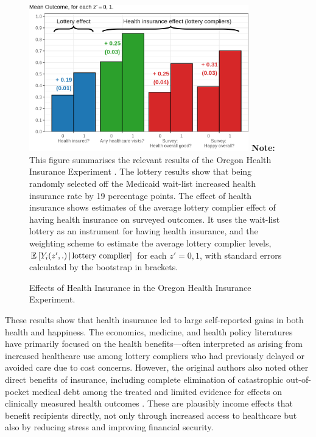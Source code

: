 \begin{figure}[!h]
    \caption{Effects of Health Insurance in the Oregon Health Insurance Experiment.}
    \centering
    \includegraphics[width=0.85\textwidth]{sections/figures/insurance-effects.png}
    \label{fig:healthinsurance-effects}
    \justify
    \footnotesize    
    \textbf{Note:}
    This figure summarises the relevant results of the Oregon Health Insurance Experiment \citep{finkelstein2008oregon}.
    The lottery results show that being randomly selected off the Medicaid wait-list increased health insurance rate by 19 percentage points.
    The effect of health insurance shows estimates of the average lottery complier effect of having health insurance on surveyed outcomes.
    It uses the wait-list lottery as an instrument for having health insurance, and the \cite{abadie2003semiparametric} weighting scheme to estimate the average lottery complier levels, $\mathbb{E}_{} \left[ Y_i(z',.) \, \middle\vert \, \text{lottery complier} \right]$ for each $z'=0,1$, with standard errors calculated by the bootstrap in brackets.
\end{figure}

These results show that health insurance led to large self-reported gains in both health and happiness.
The economics, medicine, and health policy literatures have primarily focused on the health benefits—often interpreted as arising from increased healthcare use among lottery compliers who had previously delayed or avoided care due to cost concerns.
However, the original authors also noted other direct benefits of insurance, including complete elimination of catastrophic out-of-pocket medical debt among the treated and limited evidence for effects on clinically measured health outcomes \citep{baicker2013oregon}.
These are plausibly income effects that benefit recipients directly, not only through increased access to healthcare but also by reducing stress and improving financial security.

